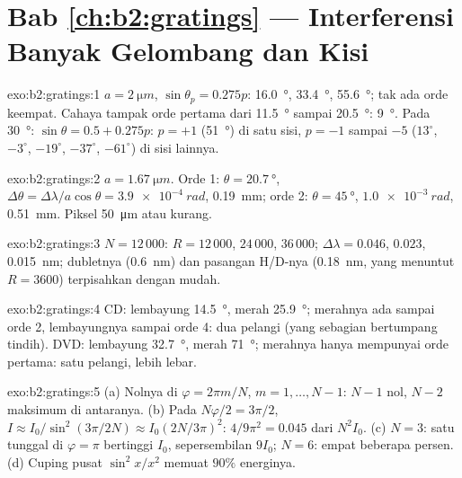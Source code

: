 \section*{Bab \ref{ch:b2:gratings} --- Interferensi Banyak Gelombang dan Kisi}

\begin{solution}{exo:b2:gratings:1}
$a = \qty{2}{\micro m}$, $\sin\theta_p = 0.275p$: \qty{16.0}{\degree}, \qty{33.4}{\degree}, \qty{55.6}{\degree};
tak ada orde keempat. Cahaya tampak orde pertama dari \qty{11.5}{\degree} sampai \qty{20.5}{\degree}:
\qty{9}{\degree}. Pada \qty{30}{\degree}: $\sin\theta = 0.5 + 0.275p$: $p = +1$ (\qty{51}{\degree}) di satu
sisi, $p = -1$ sampai $-5$ ($13^\circ$, $-3^\circ$, $-19^\circ$, $-37^\circ$, $-61^\circ$) di sisi
lainnya.
\end{solution}

\begin{solution}{exo:b2:gratings:2}
$a = \qty{1.67}{\micro m}$. Orde 1: $\theta = \qty{20.7}{\degree}$, $\Delta\theta = \Delta\lambda/a\cos\theta =
\qty{3.9e-4}{rad}$, \qty{0.19}{mm}; orde 2: $\theta = \qty{45}{\degree}$, $\qty{1.0e-3}{rad}$,
\qty{0.51}{mm}. Piksel \qty{50}{\micro m} atau kurang.
\end{solution}

\begin{solution}{exo:b2:gratings:3}
$N = 12\,000$: $R = 12\,000$, $24\,000$, $36\,000$; $\Delta\lambda = 0.046$, $0.023$, \qty{0.015}{nm};
dubletnya (\qty{0.6}{nm}) dan pasangan H/D-nya (\qty{0.18}{nm}, yang menuntut $R = 3600$)
terpisahkan dengan mudah.
\end{solution}

\begin{solution}{exo:b2:gratings:4}
CD: lembayung \qty{14.5}{\degree}, merah \qty{25.9}{\degree}; merahnya ada sampai orde 2, lembayungnya sampai
orde 4: dua pelangi (yang sebagian bertumpang tindih). DVD: lembayung \qty{32.7}{\degree}, merah
\qty{71}{\degree}; merahnya hanya mempunyai orde pertama: satu pelangi, lebih lebar.
\end{solution}

\begin{solution}{exo:b2:gratings:5}
(a) Nolnya di $\varphi = 2\pi m/N$, $m = 1, \dots, N - 1$: $N - 1$ nol, $N - 2$ maksimum
di antaranya. (b) Pada $N\varphi/2 = 3\pi/2$, $I \approx I_0/\sin^2(3\pi/2N) \approx I_0(2N/3\pi)^2$:
$4/9\pi^2 = 0.045$ dari $N^2I_0$. (c) $N = 3$: satu  tunggal di
$\varphi = \pi$ bertinggi $I_0$, sepersembilan  $9I_0$; $N = 6$: empat
 beberapa persen. (d) Cuping pusat $\sin^2x/x^2$
memuat $90\%$ energinya.
\end{solution}

